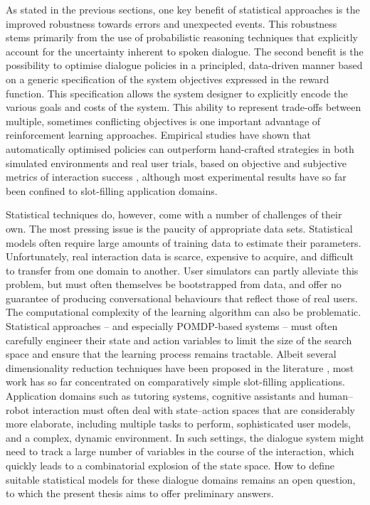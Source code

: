 
As stated in the previous sections, one key benefit of statistical approaches is the improved robustness towards errors and unexpected events. This robustness stems primarily from the use of probabilistic reasoning techniques that explicitly account for the uncertainty inherent to spoken dialogue.  The second benefit is the possibility to optimise dialogue policies in a principled, data-driven manner based on a generic specification of the system objectives expressed in the reward function.  This specification allows the system designer to explicitly encode the various goals and costs of the system. This ability to represent trade-offs between multiple, sometimes conflicting objectives is one important advantage of reinforcement learning approaches.  Empirical studies have shown that automatically optimised policies can outperform hand-crafted strategies in both simulated environments and real user trials, based on objective and subjective metrics of interaction success \citep{Supelec270,6407655}, although most experimental results have so far been confined to slot-filling application domains. 

Statistical techniques do, however, come with a number of challenges of their own. The most pressing issue is the paucity of appropriate data sets.  Statistical models often require large amounts of training data to estimate their parameters. Unfortunately, real interaction data is scarce, expensive to acquire, and difficult to transfer from one domain to another.  User simulators can partly alleviate this problem, but must often themselves be bootstrapped from data, and offer no guarantee of producing conversational behaviours that reflect those of real users.  The computational complexity of the learning algorithm can also be problematic. Statistical approaches -- and especially POMDP-based systems -- must often carefully engineer their state and action variables to limit the size of the search space and ensure that the learning process remains tractable.  Albeit several dimensionality reduction techniques have been proposed in the literature \citep{williams2005,Young:2010,Cuayahuitl:2010,CrookL11}, most work has so far concentrated on comparatively simple slot-filling applications.  Application domains such as tutoring systems, cognitive assistants and human--robot interaction must often deal with state--action spaces that are considerably more elaborate, including multiple tasks to perform, sophisticated user models, and a complex, dynamic environment.  In such settings, the dialogue system might need to track a large number of variables in the course of the interaction, which quickly leads to a combinatorial explosion of the state space.  How to define suitable statistical models for these dialogue domains remains an open question, to which the present thesis aims to offer preliminary answers. 

